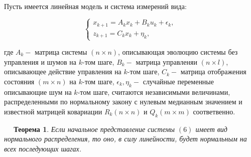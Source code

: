 \documentclass[12pt, a4paper]{article}
\newtheorem{theorem}{$\quad$ Теорема}
\begin{document}
\quad \\ Пусть имеется линейная модель и система измерений вида:

\begin{equation}
\begin{cases}
x_{k+1} = A_{k}x_{k} + B_{k}u_{k} + \epsilon_{k}, \\
z_{k+1} = C_{k}x_{k} + \eta_{k},
\end{cases}
\end{equation}

где $A_k - $ матрица системы $(n \times n)$, описывающая эволюцию системы без управления и шумов на $k$-том шаге, $B_k - $ матрица управленяи $(n \times l)$, описывающее действие управления на $k$-том шаге, $C_k - $ матрица отображения состояния $(m \times n)$ на $k$-том шаге, $\epsilon_{k}, \eta_{k} - $ случайные переменные описывающие шум на $k$-том шаге, считаются независимыми величинами, распределенными по нормальному закону с нулевым медианным значением и известной матрицей ковариации $R_k(n \times n)$ и $Q_k(m \times m)$ соответвенно.

\newpage
\begin{theorem}
Если начальное представление системы $(6)$ имеет вид нормального распределения, то оно, в силу линейности, будет нормальным на всех последующих шагах.
\end{theorem}
\end{document}
